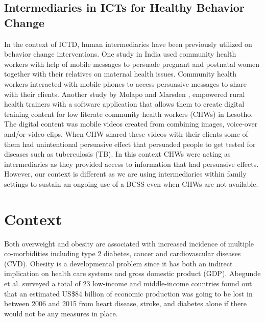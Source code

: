 \documentclass{sig-alternate}
\begin{document}
\subsection{Intermediaries in ICTs for Healthy Behavior Change}

In the context of ICTD, human intermediaries have been previously utilized on
behavior change interventions. One study
\cite{ramachandran2010mobile,ramachandran2010research} in India used community
health workers with help of mobile messages to persuade pregnant and postnatal
women together with their relatives on maternal health issues.  Community
health workers interacted with mobile phones to access persuasive messages to
share with their clients. Another study by Molapo and Marsden
\cite{molapo2013software},  empowered rural health trainers with a software
application that allows them to create digital  training  content  for low
literate community health workers (CHWs) in Lesotho. The digital content was
mobile videos created from  combining  images, voice-over and/or  video clips.
When CHW shared these videos with their clients some of them had unintentional
persuasive effect that persuaded people to get tested for diseases such as
tuberculosis (TB). In this context CHWs were acting as intermediaries as they
provided access to information that had persuasive effects. However, our
context is different as we are using intermediaries within family settings to
sustain an ongoing use of a BCSS even when CHWs are not available.

\section{Context}

Both overweight and obesity are associated with increased incidence of
multiple co-morbidities including type 2 diabetes, cancer and cardiovascular
diseases (CVD)\cite{guh2009incidence}. Obesity is a developmental problem
since it has both an indirect implication on health care systems and gross
domestic product (GDP). Abegunde et al.\cite{abegunde:theburden} surveyed a
total of 23 low-income and middle-income countries found out that an estimated
US\$84 billion of economic production was going to be lost in between 2006 and
2015 from heart disease, stroke, and diabetes alone if there would not be any
measures in place.
\end{document}

